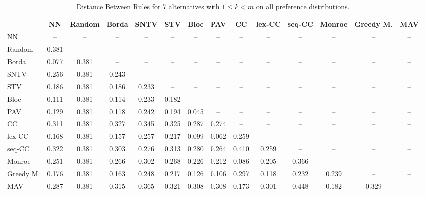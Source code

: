 
\begin{table*}
\centering
\begin{tabular}{lccccccccccccc}
\toprule
 & NN & Random & Borda & SNTV & STV & Bloc & PAV & CC & lex-CC & seq-CC & Monroe & Greedy M. & MAV \\
\midrule
NN & -- & -- & -- & -- & -- & -- & -- & -- & -- & -- & -- & -- & -- \\
Random & 0.381 & -- & -- & -- & -- & -- & -- & -- & -- & -- & -- & -- & -- \\
Borda & 0.077 & 0.381 & -- & -- & -- & -- & -- & -- & -- & -- & -- & -- & -- \\
SNTV & 0.256 & 0.381 & 0.243 & -- & -- & -- & -- & -- & -- & -- & -- & -- & -- \\
STV & 0.186 & 0.381 & 0.186 & 0.233 & -- & -- & -- & -- & -- & -- & -- & -- & -- \\
Bloc & 0.111 & 0.381 & 0.114 & 0.233 & 0.182 & -- & -- & -- & -- & -- & -- & -- & -- \\
PAV & 0.129 & 0.381 & 0.118 & 0.242 & 0.194 & 0.045 & -- & -- & -- & -- & -- & -- & -- \\
CC & 0.311 & 0.381 & 0.327 & 0.345 & 0.325 & 0.287 & 0.274 & -- & -- & -- & -- & -- & -- \\
lex-CC & 0.168 & 0.381 & 0.157 & 0.257 & 0.217 & 0.099 & 0.062 & 0.259 & -- & -- & -- & -- & -- \\
seq-CC & 0.322 & 0.381 & 0.303 & 0.276 & 0.313 & 0.280 & 0.264 & 0.410 & 0.259 & -- & -- & -- & -- \\
Monroe & 0.251 & 0.381 & 0.266 & 0.302 & 0.268 & 0.226 & 0.212 & 0.086 & 0.205 & 0.366 & -- & -- & -- \\
Greedy M. & 0.176 & 0.381 & 0.163 & 0.248 & 0.217 & 0.126 & 0.106 & 0.297 & 0.118 & 0.232 & 0.239 & -- & -- \\
MAV & 0.287 & 0.381 & 0.315 & 0.365 & 0.321 & 0.308 & 0.308 & 0.173 & 0.301 & 0.448 & 0.182 & 0.329 & -- \\
\bottomrule
\end{tabular}

\caption{Distance Between Rules for 7 alternatives with $1 \leq k < m$ on all preference distributions.}
\end{table*}
